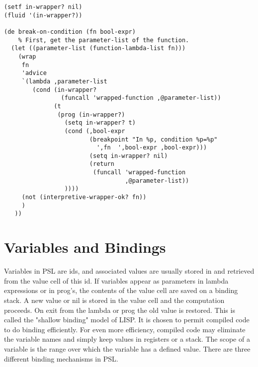 \begin{verbatim}
(setf in-wrapper? nil)
(fluid '(in-wrapper?))

(de break-on-condition (fn bool-expr)
    % First, get the parameter-list of the function.
  (let ((parameter-list (function-lambda-list fn)))
    (wrap
     fn
     'advice
     `(lambda ,parameter-list
        (cond (in-wrapper?   
                (funcall 'wrapped-function ,@parameter-list))
              (t
               (prog (in-wrapper?)
                 (setq in-wrapper? t)
                 (cond (,bool-expr
                        (breakpoint "In %p, condition %p=%p"
                          ',fn  ',bool-expr ,bool-expr)))
                        (setq in-wrapper? nil)
                        (return
                         (funcall 'wrapped-function
                                  ,@parameter-list))
                 ))))
     (not (interpretive-wrapper-ok? fn))
     )
   ))
\end{verbatim}
\section{Variables and Bindings}

  Variables in PSL are ids, and associated  values  are  usually
stored  in  and  retrieved  from  the value cell of this id.  If
variables appear as  parameters  in  lambda  expressions  or  in
prog's,  the  contents  of the value cell are saved on a binding
stack.  A new value or nil is stored in the value cell  and  the
computation  proceeds.   On exit from the lambda or prog the old
value is restored.  This is called the "shallow  binding"  model
of  LISP.    It  is chosen to permit compiled code to do binding
efficiently.   For  even  more  efficiency,  compiled  code  may
eliminate the variable names and simply keep values in registers
or a stack.  The scope of a variable is the range over which the
variable has a defined value.  There are three different binding
mechanisms in PSL.\\

